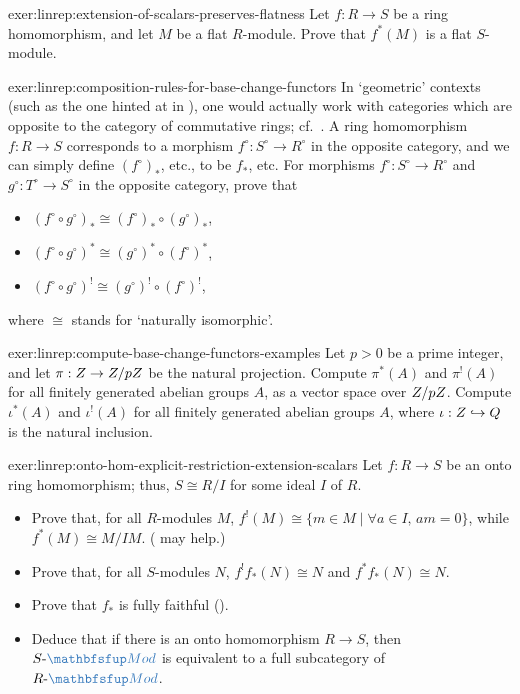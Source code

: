\begin{exer}{}{exer:linrep:extension-of-scalars-preserves-flatness}
  Let $f : R \to S$ be a ring homomorphism, and let $M$ be a flat
  $R$-module. Prove that $f^*(M)$ is a flat $S$-module.
\end{exer}
\begin{exer}{}{exer:linrep:composition-rules-for-base-change-functors}
  In `geometric' contexts (such as the one hinted at in
  ), one would actually
  work with categories
  which are opposite to the category of commutative rings; cf.\
  . A ring
  homomorphism $f : R \to S$
  corresponds to a morphism $f^\circ : S^\circ \to R^\circ$ in the
  opposite category, and we can simply define $(f^\circ)_*$, etc., to
  be $f_*$, etc. For morphisms $f^\circ : S^\circ \to R^\circ$ and
  $g^\circ : T^\circ \to S^\circ$ in the opposite category, prove that
  \begin{itemize}
  \item
    $(f^\circ \circ g^\circ)_* \cong (f^\circ)_* \circ (g^\circ)_*$,
  \item
    $(f^\circ \circ g^\circ)^* \cong (g^\circ)^* \circ (f^\circ)^*$,
  \item
    $(f^\circ \circ g^\circ)^! \cong (g^\circ)^! \circ (f^\circ)^!$,
  \end{itemize}
  where $\cong$ stands for `naturally isomorphic'.
\end{exer}
\begin{exer}{}{exer:linrep:compute-base-change-functors-examples}
  Let $p > 0$ be a prime integer, and let $\pi : Z \to Z/pZ$ be the
  natural projection. Compute $\pi^*(A)$ and $\pi^!(A)$ for all
  finitely generated abelian groups $A$, as a vector space over
  $Z/pZ$. Compute $\iota^*(A)$ and $\iota^!(A)$ for all finitely
  generated abelian groups $A$, where $\iota : Z \hookrightarrow Q$
  is the natural inclusion.
\end{exer}
\begin{exer}{}{exer:linrep:onto-hom-explicit-restriction-extension-scalars}
  Let $f : R \to S$ be an onto ring homomorphism; thus, $S \cong R/I$
  for some ideal $I$ of $R$.
  \begin{itemize}
  \item Prove that, for all $R$-modules $M$,
    $f^!(M) \cong \{m \in M \mid \forall a \in I,\, am = 0\}$, while
    $f^*(M) \cong
    M/IM$. (
    may help.)
  \item Prove that, for all $S$-modules $N$, $f^! f_*(N) \cong N$ and
    $f^* f_*(N) \cong N$.
  \item Prove that $f_*$ is fully faithful ().
  \item Deduce that if there is an onto homomorphism $R \to S$, then
    $S\text{-}\categ{Mod}$ is equivalent to a full subcategory of
    $R\text{-}\categ{Mod}$.
  \end{itemize}
\end{exer}
